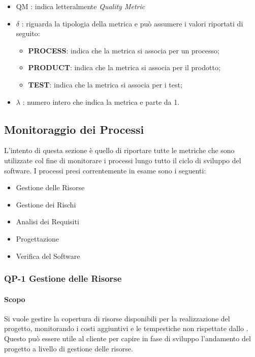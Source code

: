 \begin{itemize}
	\item QM : indica letteralmente \textit{Quality Metric}
	\item \(\delta\) : riguarda la tipologia della metrica e può assumere i valori riportati di seguito:
		\begin{itemize}
			\item \textbf{PROCESS}: indica che la metrica si associa per un processo;
			\item \textbf{PRODUCT}: indica che la metrica si associa per il prodotto;
			\item \textbf{TEST}: indica che la metrica si associa per i test;
		\end{itemize}
	\item \(\lambda\) : numero intero che indica la metrica e parte da 1.
\end{itemize}

\subsection{Monitoraggio dei Processi}

L'intento di questa sezione è quello di riportare tutte le metriche che sono utilizzate col fine di monitorare i processi lungo tutto il ciclo di sviluppo del software. I processi presi correntemente in esame sono i seguenti:

\begin{itemize}
	\item Gestione delle Risorse
	\item Gestione dei Rischi
	\item Analisi dei Requisiti
	\item Progettazione 
	\item Verifica del Software
\end{itemize}

	\subsubsection{QP-1 Gestione delle Risorse}

		\paragraph{Scopo}

		Si vuole gestire la copertura di risorse disponibili per la realizzazione del progetto, monitorando i costi aggiuntivi e le tempestiche non rispettate dallo . Questo può essere utile al cliente per capire in fase di sviluppo l'andamento del progetto a livello di gestione delle risorse.


